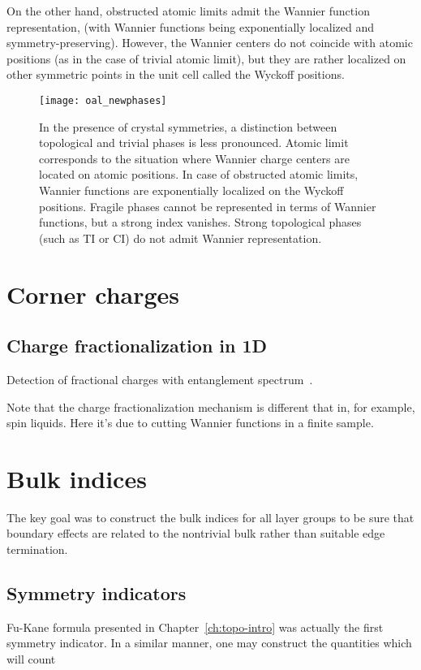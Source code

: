 On the other hand, obstructed atomic limits admit the Wannier function representation, (with Wannier functions being exponentially localized and symmetry-preserving). However, the Wannier centers do not coincide with atomic positions (as in the case of trivial atomic limit), but they are rather localized on other symmetric points in the unit cell called the Wyckoff positions.


\begin{figure}
\centering
\texttt{[image: oal\_newphases]}
\caption{In the presence of crystal symmetries, a distinction between topological and trivial phases is less pronounced. Atomic limit corresponds to the situation where Wannier charge centers are located on atomic positions. In case of obstructed atomic limits, Wannier functions are exponentially localized on the Wyckoff positions. Fragile phases cannot be represented in terms of Wannier functions, but a strong index vanishes. Strong topological phases (such as TI or CI) do not admit Wannier representation.}
\label{fig:newphases}
\end{figure}




\section{Corner charges}

\subsection{Charge fractionalization in 1D}


Detection of fractional charges with entanglement spectrum~\cite{PhysRevB.101.115140}.




Note that the charge fractionalization mechanism is different that in, for example, spin liquids. Here it's due to cutting Wannier functions in a finite sample.




\section{Bulk indices}
The key goal was to construct the bulk indices for all layer groups to be sure that boundary effects are related to the nontrivial bulk rather than suitable edge termination.



\subsection{Symmetry indicators}
Fu-Kane formula presented in Chapter~\ref{ch:topo-intro} was actually the first symmetry indicator. In a similar manner, one may construct the quantities which will count


